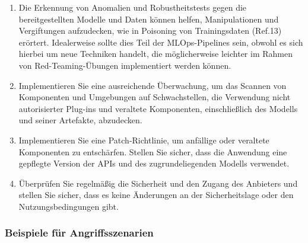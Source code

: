 \documentclass[
]{article}
\begin{document}
\begin{enumerate}
\item
  Die Erkennung von Anomalien und Robustheitstests gegen die
  bereitgestellten Modelle und Daten können helfen, Manipulationen und
  Vergiftungen aufzudecken, wie in Poisoning von Trainingsdaten (Ref.13)
  erörtert. Idealerweise sollte dies Teil der MLOps-Pipelines sein,
  obwohl es sich hierbei um neue Techniken handelt, die möglicherweise
  leichter im Rahmen von Red-Teaming-Übungen implementiert werden
  können.
\item
  Implementieren Sie eine ausreichende Überwachung, um das Scannen von
  Komponenten und Umgebungen auf Schwachstellen, die Verwendung nicht
  autorisierter Plug-ins und veraltete Komponenten, einschließlich des
  Modells und seiner Artefakte, abzudecken.
\item
  Implementieren Sie eine Patch-Richtlinie, um anfällige oder veraltete
  Komponenten zu entschärfen. Stellen Sie sicher, dass die Anwendung
  eine gepflegte Version der APIs und des zugrundeliegenden Modells
  verwendet.
\item
  Überprüfen Sie regelmäßig die Sicherheit und den Zugang des Anbieters
  und stellen Sie sicher, dass es keine Änderungen an der
  Sicherheitslage oder den Nutzungsbedingungen gibt.
\end{enumerate}

\subsubsection{Beispiele für
Angriffsszenarien}\label{beispiele-fuxfcr-angriffsszenarien}
\end{document}

